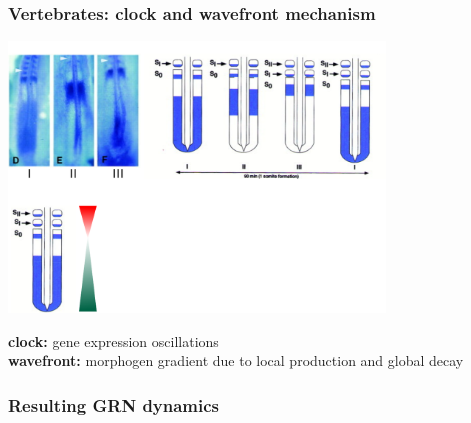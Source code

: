 \documentclass[compress]{beamer}
\begin{document}
\begin{frame}
    \frametitle{Vertebrates: clock and wavefront mechanism}
   \begin{center}

     \includegraphics[width=0.75\textwidth]{figures/palmeirim_osc.pdf}\\
  
    \end{center}
{\bf clock:} gene expression oscillations\\
{\bf wavefront:} morphogen gradient due to local production and global decay
\end{frame}
\begin{frame}
\frametitle{Resulting GRN dynamics}
   \begin{center}
\\    
   \end{center}

\end{frame}
\end{document}
